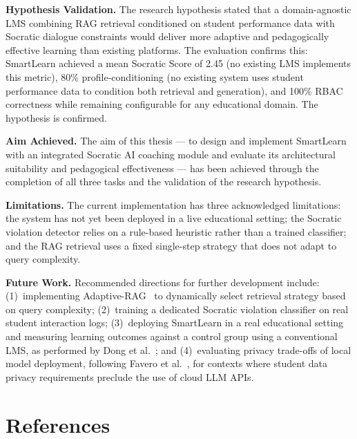 \documentclass[12pt,a4paper]{report}
\begin{document}
\noindent\textbf{Hypothesis Validation.} The research hypothesis stated that a domain-agnostic
LMS combining RAG retrieval conditioned on student performance data with Socratic dialogue
constraints would deliver more adaptive and pedagogically effective learning than existing
platforms. The evaluation confirms this: SmartLearn achieved a mean Socratic Score of 2.45 (no
existing LMS implements this metric), 80\% profile-conditioning (no existing system uses student
performance data to condition both retrieval and generation), and 100\% RBAC correctness while
remaining configurable for any educational domain. The hypothesis is confirmed.

\noindent\textbf{Aim Achieved.} The aim of this thesis --- to design and implement SmartLearn
with an integrated Socratic AI coaching module and evaluate its architectural suitability and
pedagogical effectiveness --- has been achieved through the completion of all three tasks and
the validation of the research hypothesis.

\noindent\textbf{Limitations.} The current implementation has three acknowledged limitations:
the system has not yet been deployed in a live educational setting; the Socratic violation
detector relies on a rule-based heuristic rather than a trained classifier; and the RAG
retrieval uses a fixed single-step strategy that does not adapt to query complexity.

\noindent\textbf{Future Work.} Recommended directions for further development include:
(1)~implementing Adaptive-RAG~\cite{ref13} to dynamically select retrieval strategy based on
query complexity; (2)~training a dedicated Socratic violation classifier on real student
interaction logs; (3)~deploying SmartLearn in a real educational setting and measuring learning
outcomes against a control group using a conventional LMS, as performed by Dong et
al.~\cite{ref1}; and (4)~evaluating privacy trade-offs of local model deployment, following
Favero et al.~\cite{ref7}, for contexts where student data privacy requirements preclude the
use of cloud LLM APIs.

\chapter*{References}
\renewcommand{\thefigure}{\thechapter.\arabic{figure}}
\end{document}
